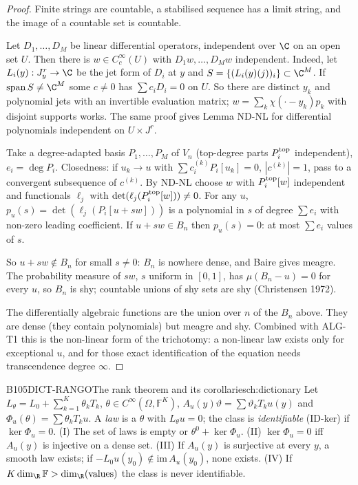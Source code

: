 \begin{proof}
Finite strings are countable, a stabilised sequence has a limit string, and the image of a countable set is countable.

Let $D_1,\dots,D_M$ be linear differential operators, independent over $\C$ on an open set $U$. Then there is $w\in C^\infty_c(U)$ with $D_1w,\dots,D_Mw$ independent. Indeed, let $L_i(y):J^r_y\to\C$ be the jet form of $D_i$ at $y$ and $S=\{(L_i(y)(j))_i\}\subset\C^M$. If $\mathrm{span}\,S\ne\C^M$ some $c\ne0$ has $\sum c_iD_i=0$ on $U$. So there are distinct $y_k$ and polynomial jets with an invertible evaluation matrix; $w=\sum_k\chi(\cdot-y_k)p_k$ with disjoint supports works. The same proof gives Lemma ND-NL for differential polynomials independent on $U\times J^r$.

Take a degree-adapted basis $P_1,\dots,P_M$ of $V_n$ (top-degree parts $P_i^{\rm top}$ independent), $e_i=\deg P_i$. Closedness: if $u_k\to u$ with $\sum c^{(k)}_iP_i[u_k]=0$, $|c^{(k)}|=1$, pass to a convergent subsequence of $c^{(k)}$. By ND-NL choose $w$ with $P_i^{\rm top}[w]$ independent and functionals $\ell_j$ with $\det(\ell_j(P_i^{\rm top}[w]))\ne0$. For any $u$, $p_u(s)=\det(\ell_j(P_i[u+sw]))$ is a polynomial in $s$ of degree $\sum e_i$ with non-zero leading coefficient. If $u+sw\in B_n$ then $p_u(s)=0$: at most $\sum e_i$ values of $s$.

So $u+sw\notin B_n$ for small $s\ne0$: $B_n$ is nowhere dense, and Baire gives meagre. The probability measure of $sw$, $s$ uniform in $[0,1]$, has $\mu(B_n-u)=0$ for every $u$, so $B_n$ is shy; countable unions of shy sets are shy (Christensen 1972).

The differentially algebraic functions are the union over $n$ of the $B_n$ above. They are dense (they contain polynomials) but meagre and shy. Combined with ALG-T1 this is the non-linear form of the trichotomy: a non-linear law exists only for exceptional $u$, and for those exact identification of the equation needs transcendence degree $\infty$.

\end{proof}

\begin{dimcard}{B105}{DICT-RANGO}{The rank theorem and its corollaries}{\pw}{ch:dictionary}
Let $L_\theta=L_0+\sum_{k=1}^K\theta_kT_k$, $\theta\in C^\infty(\Omega,\mathbb F^K)$, $A_u(y)\vartheta=\sum\vartheta_kT_ku(y)$ and $\Phi_u(\theta)=\sum\theta_kT_ku$. A \emph{law} is a $\theta$ with $L_\theta u=0$; the class is \emph{identifiable} (ID-ker) if $\ker\Phi_u=0$.
(I) The set of laws is empty or $\theta^0+\ker\Phi_u$. (II) $\ker\Phi_u=0$ iff $A_u(y)$ is injective on a dense set. (III) If $A_u(y)$ is surjective at every $y$, a smooth law exists; if $-L_0u(y_0)\notin\mathrm{im}\,A_u(y_0)$, none exists. (IV) If $K\dim_\R\mathbb F>\dim_\R(\text{values})$ the class is never identifiable.
\end{dimcard}

